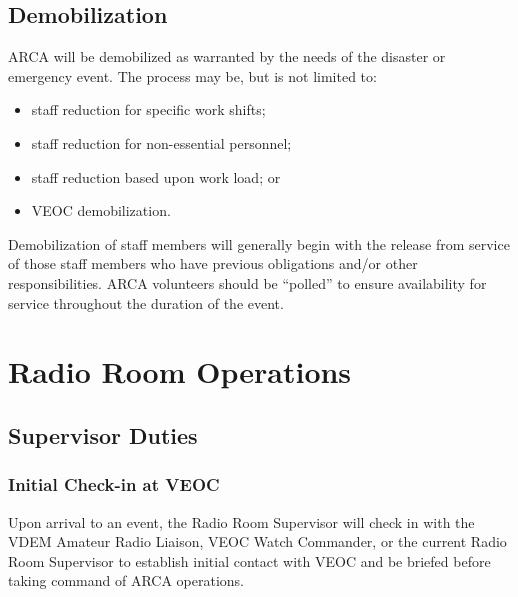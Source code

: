 \documentclass[pdflatex,letterpaper,twoside,12pt]{book}
\begin{document}
\section{Demobilization}

ARCA will be demobilized as warranted by the needs of the disaster or emergency event.  The process may be, but is not limited to:

\begin{itemize}
	\item staff reduction for specific work shifts;
	\item staff reduction for non-essential personnel;
	\item staff reduction based upon work load; or
	\item VEOC demobilization.
\end{itemize}

Demobilization of staff members will generally begin with the release from service of those staff members who have previous obligations and/or other responsibilities.  ARCA volunteers should be ``polled'' to ensure availability for service throughout the duration of the event.


\chapter{Radio Room Operations}

\section{Supervisor Duties}

\subsection{Initial Check-in at VEOC}

Upon arrival to an event, the Radio Room Supervisor will check in with the VDEM Amateur Radio Liaison, VEOC Watch Commander, or the current Radio Room Supervisor to establish initial contact with VEOC and be briefed before taking command of ARCA operations.
\end{document}

